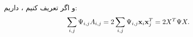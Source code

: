 و اگر تعریف کنیم
، 
داریم:
\begin{equation}
\sum_{i, j} \Psi_{i, j}A_{i,j} = 2 \sum_{i, j} \Psi_{i, j} \mathbf{x}_i \mathbf{x}_j^T = 2 X^T \Psi X.
\label{app:xixj}
\end{equation}

